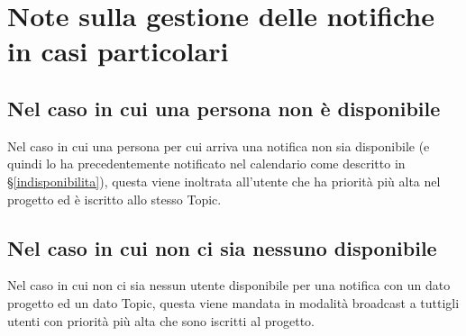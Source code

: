 \section{Note sulla gestione delle notifiche in casi particolari}\label{note}

\subsection{Nel caso in cui una persona non è disponibile}
Nel caso in cui una persona per cui arriva una notifica non sia disponibile (e quindi lo ha precedentemente notificato nel calendario come descritto in \S\ref{indisponibilita}), questa viene inoltrata all'utente che ha priorità più alta nel progetto ed è iscritto allo stesso Topic.

\subsection{Nel caso in cui non ci sia nessuno disponibile}
Nel caso in cui non ci sia nessun utente disponibile per una notifica con un dato progetto ed un dato Topic, questa viene mandata in modalità broadcast a tuttigli utenti con priorità più alta che sono iscritti al progetto.